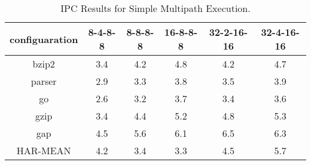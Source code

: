 \begin{table}
\begin{center}
\caption{IPC Results for Simple Multipath Execution.}
\label{tab:ipc1}
\begin{tabular}{|c|c|c|c|c|c|}
\hline 
configuaration&
8-4-8-8&
8-8-8-8&
16-8-8-8&
32-2-16-16&
32-4-16-16\\
\hline
bzip2&3.4&4.2&4.8&4.2&4.7\\
\hline 
parser&2.9&3.3&3.8&3.5&3.9\\
\hline 
go&2.6&3.2&3.7&3.4&3.6\\
\hline 
gzip&3.4&4.4&5.2&4.8&5.3\\
\hline 
gap&4.5&5.6&6.1&6.5&6.3\\
\hline 
\hline 
HAR-MEAN&4.2&3.4&3.3&4.5&5.7\\
\hline
\end{tabular}
\end{center}
\end{table}
